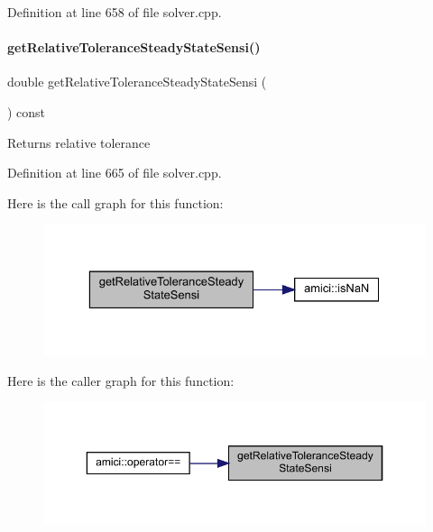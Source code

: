 Definition at line 658 of file solver.\+cpp.

\mbox{\label{classamici_1_1_solver_ac47e18a62130e7c84a8d7ceb0cb9d7eb}} 
\paragraph{\texorpdfstring{getRelativeToleranceSteadyStateSensi()}{getRelativeToleranceSteadyStateSensi()}}
{\footnotesize\ttfamily double get\+Relative\+Tolerance\+Steady\+State\+Sensi (\begin{DoxyParamCaption}{ }\end{DoxyParamCaption}) const}

\begin{DoxyReturn}{Returns}
relative tolerance 
\end{DoxyReturn}


Definition at line 665 of file solver.\+cpp.

Here is the call graph for this function\+:
\nopagebreak
\begin{figure}[H]
\begin{center}
\leavevmode
\includegraphics[width=329pt]{classamici_1_1_solver_ac47e18a62130e7c84a8d7ceb0cb9d7eb_cgraph}
\end{center}
\end{figure}
Here is the caller graph for this function\+:
\nopagebreak
\begin{figure}[H]
\begin{center}
\leavevmode
\includegraphics[width=350pt]{classamici_1_1_solver_ac47e18a62130e7c84a8d7ceb0cb9d7eb_icgraph}
\end{center}
\end{figure}
\mbox{\label{classamici_1_1_solver_a7a324b1a30b5246828354c60c86c3583}} 
